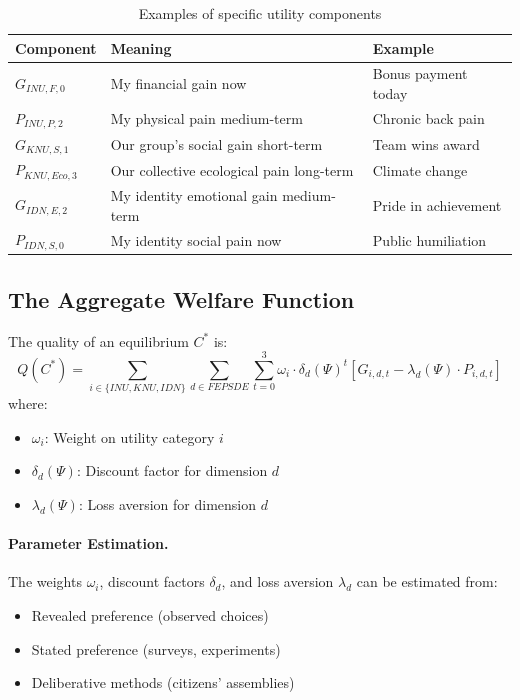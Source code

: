 \begin{table}[h]
\centering
\begin{tabular}{lll}
\toprule
\textbf{Component} & \textbf{Meaning} & \textbf{Example} \\
\midrule
$G_{INU,F,0}$ & My financial gain now & Bonus payment today \\
$P_{INU,P,2}$ & My physical pain medium-term & Chronic back pain \\
$G_{KNU,S,1}$ & Our group's social gain short-term & Team wins award \\
$P_{KNU,Eco,3}$ & Our collective ecological pain long-term & Climate change \\
$G_{IDN,E,2}$ & My identity emotional gain medium-term & Pride in achievement \\
$P_{IDN,S,0}$ & My identity social pain now & Public humiliation \\
\bottomrule
\end{tabular}
\caption{Examples of specific utility components}
\label{tab:utility-components}
\end{table}

\subsection{The Aggregate Welfare Function}

\begin{definition}
The quality of an equilibrium $C^*$ is:
\begin{equation}
  Q(C^*) = \sum_{i \in \{INU, KNU, IDN\}} \sum_{d \in FEPSDE} \sum_{t=0}^{3}
           \omega_i \cdot \delta_d(\Psi)^t \left[ G_{i,d,t} - \lambda_d(\Psi) \cdot P_{i,d,t} \right]
  \label{eq:equilibrium-quality}
\end{equation}
where:
\begin{itemize}[nosep]
  \item $\omega_i$: Weight on utility category $i$
  \item $\delta_d(\Psi)$: Discount factor for dimension $d$
  \item $\lambda_d(\Psi)$: Loss aversion for dimension $d$
\end{itemize}
\end{definition}

\paragraph{Parameter Estimation.}
The weights $\omega_i$, discount factors $\delta_d$, and loss aversion $\lambda_d$
can be estimated from:
\begin{itemize}[nosep]
  \item Revealed preference (observed choices)
  \item Stated preference (surveys, experiments)
  \item Deliberative methods (citizens' assemblies)
\end{itemize}

